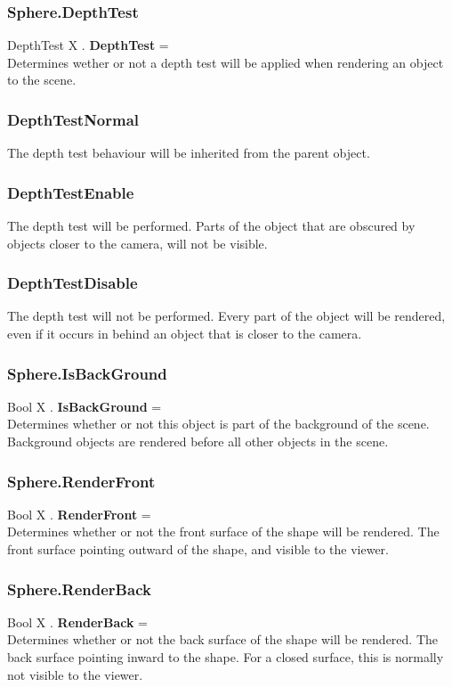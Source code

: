 \subsubsection{Sphere.DepthTest \label{F:Sphere:DepthTest}}
DepthTest X . \textbf{DepthTest} = \\
Determines wether or not a depth test will be applied when rendering an object to the scene.

\subsubsection{DepthTestNormal \label{T:DepthTest|DepthTestNormal}}
The depth test behaviour will be inherited from the parent object.

\subsubsection{DepthTestEnable \label{T:DepthTest|DepthTestEnable}}
The depth test will be performed. Parts of the object that are obscured by objects closer to the camera, will not be visible.

\subsubsection{DepthTestDisable \label{T:DepthTest|DepthTestDisable}}
The depth test will not be performed. Every part of the object will be rendered, even if it occurs in behind an object that is closer to the camera.

\subsubsection{Sphere.IsBackGround \label{F:Sphere:IsBackGround}}
Bool X . \textbf{IsBackGround} = \\
Determines whether or not this object is part of the background of the scene. Background objects are rendered before all other objects in the scene.

\subsubsection{Sphere.RenderFront \label{F:Sphere:RenderFront}}
Bool X . \textbf{RenderFront} = \\
Determines whether or not the front surface of the shape will be rendered. The front surface pointing outward of the shape, and visible to the viewer.

\subsubsection{Sphere.RenderBack \label{F:Sphere:RenderBack}}
Bool X . \textbf{RenderBack} = \\
Determines whether or not the back surface of the shape will be rendered. The back surface pointing inward to the shape. For a closed surface, this is normally not visible to the viewer.

